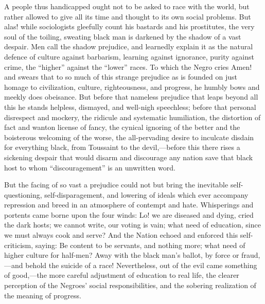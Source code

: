 A people thus handicapped ought not to be asked to race with the
world, but rather allowed to give all its time and thought to its own
social problems. But alas! while sociologists gleefully count his
bastards and his prostitutes, the very soul of the toiling, sweating
black man is darkened by the shadow of a vast despair. Men call the
shadow prejudice, and learnedly explain it as the natural defence of
culture against barbarism, learning against ignorance, purity against
crime, the ``higher'' against the ``lower'' races. To which the Negro
cries Amen! and swears that to so much of this strange prejudice as is
founded on just homage to civilization, culture, righteousness, and
progress, he humbly bows and meekly does obeisance. But before that
nameless prejudice that leaps beyond all this he stands helpless,
dismayed, and well-nigh speechless; before that personal disrespect
and mockery, the ridicule and systematic humiliation, the distortion
of fact and wanton license of fancy, the cynical ignoring of the
better and the boisterous welcoming of the worse, the all-pervading
desire to inculcate disdain for everything  black, from
Toussaint to the devil,---be\-fore this there rises a sickening
despair that would disarm and discourage any nation save that black
host to whom ``discouragement'' is an unwritten word.

But the facing of so vast a prejudice could not but bring the
inevitable self-questioning, self-disparagement, and lowering of
ideals which ever accompany repression and breed in an atmosphere of
contempt and hate. Whisperings and portents came borne upon the four
winds: Lo! we are diseased and dying, cried the dark hosts; we cannot
write, our voting is vain; what need of education, since we must
always cook and serve? And the Nation echoed and enforced this
self-criticism, saying: Be content to be servants, and nothing more;
what need of higher culture for half-men? Away with the black man's
ballot, by force or fraud,---and behold the suicide of a race!
Nevertheless, out of the evil came something of good,---the more
careful adjustment of education to real life, the clearer perception
of the Negroes' social responsibilities, and the sobering realization
of the meaning of progress.

